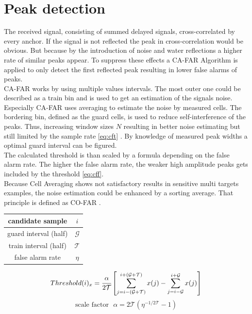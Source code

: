 \section{Peak detection}
The received signal, consisting of summed delayed signals, cross-correlated by every anchor. If the signal is not reflected the peak in cross-correlation would be obvious. But because by the introduction of noise and water reflections a higher rate of similar peaks appear. To suppress these effects a CA-FAR Algorithm \cite{rohling11} is applied to only detect the first reflected peak resulting in lower false alarms of peaks. \\
CA-FAR works by using multiple values intervals. The most outer one could be described as a train bin and is used to get an estimation of the signals noise. Especially CA-FAR uses averaging to estimate the noise by measured cells. The bordering bin, defined as the guard cells, is used to reduce self-interference of the peaks. Thus, increasing window sizes $N$ resulting in better noise estimating but still limited by the sample rate \ref{eq:cft} \cite{rohling11}\cite{radarbasics}. By knowledge of measured peak widths a optimal guard interval can be figured.\\
The calculated threshold is than scaled by a formula depending on the false alarm rate. The higher the false alarm rate, the weaker high amplitude peaks gets included by the threshold \ref{eq:cff}.\\
Because Cell Averaging shows not satisfactory results in sensitive multi targets examples, the noise estimation could be enhanced by a sorting average. That principle is defined as CO-FAR \cite{rohling11}. 
\begin{center}
	\begin{tabular}{|c|c|}
		\hline
		candidate sample & $i$\\
		\hline
		guard interval (half) & $\mathcal{G}$ \\
		\hline
		train interval (half) & $\mathcal{T}$ \\
		\hline
		false alarm rate & $\eta$\\
		\hline
	\end{tabular}
	\linebreak
\end{center}

\begin{equation}
	Threshold(i)_x=
	\cfrac{\alpha}{2\mathcal{T}}
	\left[ \sum_{j=i-\left( \mathcal{G}+\mathcal{T}\right) }^{i+\left( \mathcal{G}+\mathcal{T}\right)}x(j) - \sum_{j=i-\mathcal{G}}^{i+\mathcal{G}}x(j) \right] 
	\label{eq:cft}
\end{equation}
\begin{equation}
	\text{scale factor}~~~
	\alpha=2\mathcal{T}\left( \eta^{-1/{2\mathcal{T}}}-1\right) 
	\label{eq:cff}
\end{equation}